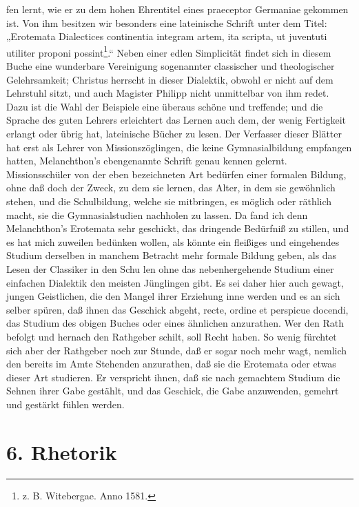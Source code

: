 fen lernt, wie er zu dem hohen Ehrentitel eines praeceptor Germaniae gekommen ist. Von ihm besitzen wir besonders eine lateinische Schrift unter dem Titel: „Erotemata Dialectices continentia integram artem, ita scripta, ut juventuti utiliter proponi possint\footnote{z. B. Witebergae. Anno 1581.}.“ Neben einer edlen Simplicität findet sich in diesem Buche eine wunderbare Vereinigung sogenannter classischer und theologischer Gelehrsamkeit; Christus herrscht in dieser Dialektik, obwohl er nicht auf dem Lehrstuhl sitzt, und auch Magister Philipp nicht unmittelbar von ihm redet. Dazu ist die Wahl der Beispiele eine überaus schöne und treffende; und die Sprache des guten Lehrers erleichtert das Lernen auch dem, der wenig Fertigkeit erlangt oder übrig hat, lateinische Bücher zu lesen. Der Verfasser dieser Blätter hat erst als Lehrer von Missionszöglingen, die keine Gymnasialbildung empfangen hatten, Melanchthon’s ebengenannte Schrift genau kennen gelernt. Missionsschüler von der eben bezeichneten Art bedürfen einer formalen Bildung, ohne daß doch der Zweck, zu dem sie lernen, das Alter, in dem sie gewöhnlich stehen, und die Schulbildung, welche sie mitbringen, es möglich oder räthlich macht, sie die Gymnasialstudien nachholen zu lassen. Da fand ich denn Melanchthon’s Erotemata sehr geschickt, das dringende Bedürfniß zu stillen, und es hat mich zuweilen bedünken wollen, als könnte ein fleißiges und eingehendes Studium derselben in manchem Betracht mehr formale Bildung geben, als das Lesen der Classiker in den Schu%
len ohne das nebenhergehende Studium einer einfachen Dialektik den meisten Jünglingen gibt. Es sei daher hier auch gewagt, jungen Geistlichen, die den Mangel ihrer Erziehung inne werden und es an sich selber spüren, daß ihnen das Geschick abgeht, recte, ordine et perspicue docendi, das Studium des obigen Buches oder eines ähnlichen anzurathen. Wer den Rath befolgt und hernach den Rathgeber schilt, soll Recht haben. So wenig fürchtet sich aber der Rathgeber noch zur Stunde, daß er sogar noch mehr wagt, nemlich den bereits im Amte Stehenden anzurathen, daß sie die Erotemata oder etwas dieser Art studieren. Er verspricht ihnen, daß sie nach gemachtem Studium die Sehnen ihrer Gabe gestählt, und das Geschick, die Gabe anzuwenden, gemehrt und gestärkt fühlen werden.

\section{6. Rhetorik}

